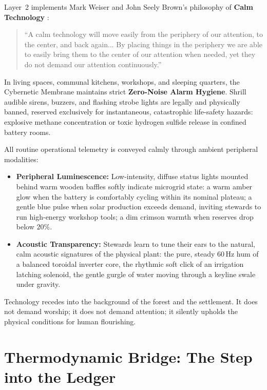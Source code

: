 Layer~2 implements Mark Weiser and John Seely Brown's philosophy of \textbf{Calm Technology} \parencite{weiser1996calm}:
\begin{quote}
    ``A calm technology will move easily from the periphery of our attention, to the center, and back again... By placing things in the periphery we are able to easily bring them to the center of our attention when needed, yet they do not demand our attention continuously.''
\end{quote}

In living spaces, communal kitchens, workshops, and sleeping quarters, the Cybernetic Membrane maintains strict \textbf{Zero-Noise Alarm Hygiene}. Shrill audible sirens, buzzers, and flashing strobe lights are legally and physically banned, reserved exclusively for instantaneous, catastrophic life-safety hazards: explosive methane concentration or toxic hydrogen sulfide release in confined battery rooms.

All routine operational telemetry is conveyed calmly through ambient peripheral modalities:
\begin{itemize}
    \item \textbf{Peripheral Luminescence:} Low-intensity, diffuse status lights mounted behind warm wooden baffles softly indicate microgrid state: a warm amber glow when the battery is comfortably cycling within its nominal plateau; a gentle blue pulse when solar production exceeds demand, inviting stewards to run high-energy workshop tools; a dim crimson warmth when reserves drop below $20\%$.
    \item \textbf{Acoustic Transparency:} Stewards learn to tune their ears to the natural, calm acoustic signatures of the physical plant: the pure, steady $60\,\mathrm{Hz}$ hum of a balanced toroidal inverter core, the rhythmic soft click of an irrigation latching solenoid, the gentle gurgle of water moving through a keyline swale under gravity.
\end{itemize}
Technology recedes into the background of the forest and the settlement. It does not demand worship; it does not demand attention; it silently upholds the physical conditions for human flourishing.

\section{Thermodynamic Bridge: The Step into the Ledger}
\label{sec:l2_bridge}


